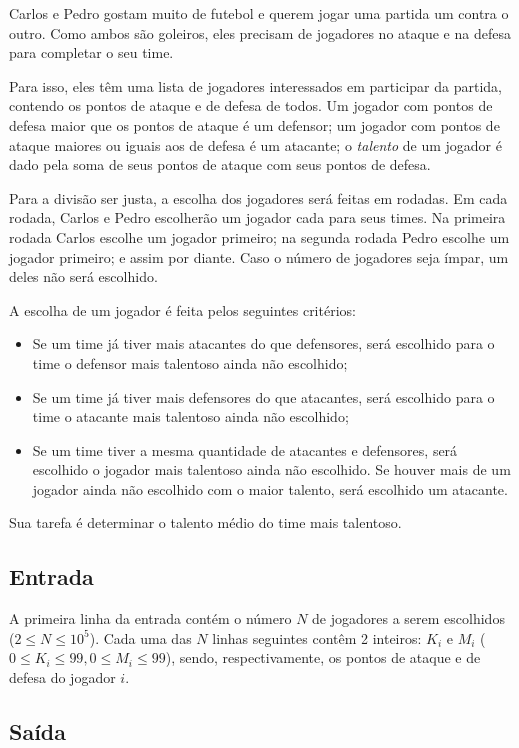     Carlos e Pedro gostam muito de futebol e querem jogar uma partida um contra o outro. Como ambos são goleiros, eles precisam de jogadores no ataque e na defesa para completar o seu time.

    Para isso, eles têm uma lista de jogadores interessados em participar da partida, contendo os
pontos de ataque e de defesa de todos. Um jogador com pontos de defesa maior que
os pontos de ataque é um defensor; um jogador com pontos de ataque maiores ou
iguais aos de defesa é um atacante; o \textit{talento} de um jogador é dado pela
soma de seus pontos de ataque com seus pontos de defesa.


    Para a divisão ser justa, a escolha dos jogadores será feitas em rodadas. Em
    cada rodada, Carlos e Pedro escolherão um jogador cada para seus times.
Na primeira rodada Carlos escolhe um jogador primeiro; na segunda rodada Pedro
escolhe um jogador primeiro; e assim por diante. Caso o número de jogadores
seja ímpar, um deles não será escolhido.

    A escolha de um jogador é feita pelos seguintes critérios:
\begin{itemize}
    \item Se um time já tiver mais atacantes do que defensores, será escolhido para o time o defensor mais talentoso ainda não escolhido;
    \item Se um time já tiver mais defensores do que atacantes, será escolhido
    para o time o atacante mais talentoso ainda não escolhido;
    \item Se um time tiver a mesma quantidade de atacantes e defensores, será
    escolhido o jogador mais talentoso ainda não escolhido. Se houver mais de um
    jogador ainda não escolhido com o maior talento, será escolhido um atacante.
\end{itemize}

Sua tarefa é determinar o talento médio do time mais talentoso.

\subsection*{Entrada}

A primeira linha da entrada contém o número $N$ de jogadores a serem escolhidos ($2\leq N\leq 10^5$).
Cada uma das $N$ linhas seguintes contêm 2 inteiros: $K_i$ e $M_i$ ($0\leq
        K_i\leq 99, 0\leq M_i\leq 99$), sendo, respectivamente, os pontos de ataque
e de defesa do jogador $i$.

\subsection*{Saída}

